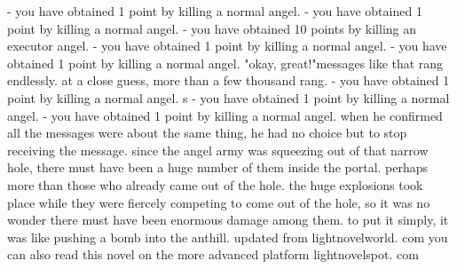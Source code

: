- you have obtained 1 point by killing a normal angel.
- you have obtained 1 point by killing a normal angel.
- you have obtained 10 points by killing an executor angel.
- you have obtained 1 point by killing a normal angel.
- you have obtained 1 point by killing a normal angel.
"okay, great!"messages like that rang endlessly.
 at a close guess, more than a few thousand rang.
- you have obtained 1 point by killing a normal angel.
s - you have obtained 1 point by killing a normal angel.
- you have obtained 1 point by killing a normal angel.
when he confirmed all the messages were about the same thing, he had no choice but to stop receiving the message.
since the angel army was squeezing out of that narrow hole, there must have been a huge number of them inside the portal.
 perhaps more than those who already came out of the hole.
the huge explosions took place while they were fiercely competing to come out of the hole, so it was no wonder there must have been enormous damage among them.
 to put it simply, it was like pushing a bomb into the anthill.
updated from lightnovelworld.
com you can also read this novel on the more advanced platform lightnovelspot.
com

 